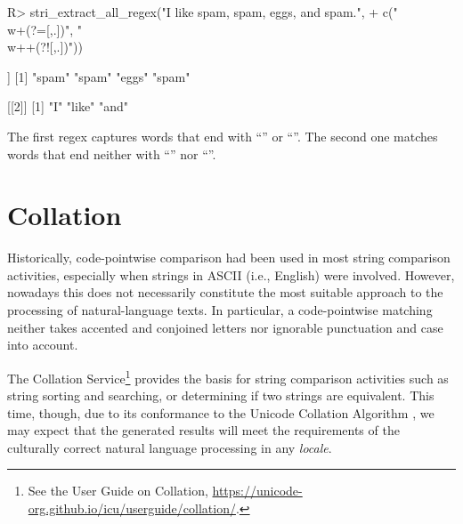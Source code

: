 \documentclass[nojss]{jss}
\begin{document}
\begin{Schunk}
\begin{Sinput}
R> stri_extract_all_regex("I like spam, spam, eggs, and spam.",
+    c("\\w+(?=[,.])", "\\w++(?![,.])"))
\end{Sinput}
\begin{Soutput}
[[1]]
[1] "spam" "spam" "eggs" "spam"

[[2]]
[1] "I"    "like" "and"
\end{Soutput}
\end{Schunk}

The first regex captures words that end with ``\code{,}'' or ``''.
The second one matches words that end neither with ``\code{,}'' nor ``''.






\section{Collation}\label{Sec:collator}



Historically, code-pointwise comparison had been used in most string comparison
activities, especially when strings in ASCII (i.e., English) were
involved. However, nowadays %
this does not necessarily constitute the most suitable
approach to the processing of natural-language texts.
In particular, a code-pointwise matching
neither takes accented and conjoined letters nor ignorable punctuation and case
into account.



The  Collation Service\footnote{See the  User Guide on {Collation},
\url{https://unicode-org.github.io/icu/userguide/collation/}.}
provides the basis for string comparison activities  such as
string sorting and searching, or determining if two strings are equivalent.
This time, though, due to its conformance to
the Unicode Collation Algorithm \citep{uts10:collation},
we may expect that the generated results
will meet the requirements of the culturally correct
natural language processing in any \textit{locale}.
\end{document}
